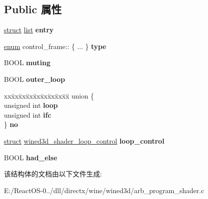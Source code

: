 \subsection*{Public 属性}
\begin{DoxyCompactItemize}
\item 
\mbox{\label{structcontrol__frame_aa423526b43057a0432e76b9eb7c77254}} 
\hyperlink{interfacestruct}{struct} \hyperlink{classlist}{list} {\bfseries entry}
\item 
\mbox{\label{structcontrol__frame_a1a349c099e5717d657955d291bcab69b}} 
\hyperlink{interfaceenum}{enum} control\+\_\+frame\+:: \{ ... \}  {\bfseries type}
\item 
\mbox{\label{structcontrol__frame_a839344df7fbbb934410daf3bd0de00d4}} 
B\+O\+OL {\bfseries muting}
\item 
\mbox{\label{structcontrol__frame_a531dfa5bb060091346a2a5ff6369063b}} 
B\+O\+OL {\bfseries outer\+\_\+loop}
\item 
\mbox{\label{structcontrol__frame_a235c06a78e06de7b7255001745c61bdd}} 
\begin{tabbing}
xx\=xx\=xx\=xx\=xx\=xx\=xx\=xx\=xx\=\kill
union \{\\
\>unsigned int {\bfseries loop}\\
\>unsigned int {\bfseries ifc}\\
\} {\bfseries no}\\

\end{tabbing}\item 
\mbox{\label{structcontrol__frame_a78e2459f97acdca82ff4038f0f005f3a}} 
\hyperlink{interfacestruct}{struct} \hyperlink{structwined3d__shader__loop__control}{wined3d\+\_\+shader\+\_\+loop\+\_\+control} {\bfseries loop\+\_\+control}
\item 
\mbox{\label{structcontrol__frame_acf5251b3f0f3cd4266e8a6516bfa68b9}} 
B\+O\+OL {\bfseries had\+\_\+else}
\end{DoxyCompactItemize}


该结构体的文档由以下文件生成\+:\begin{DoxyCompactItemize}
\item 
E\+:/\+React\+O\+S-\/0../dll/directx/wine/wined3d/arb\+\_\+program\+\_\+shader.\+c\end{DoxyCompactItemize}
